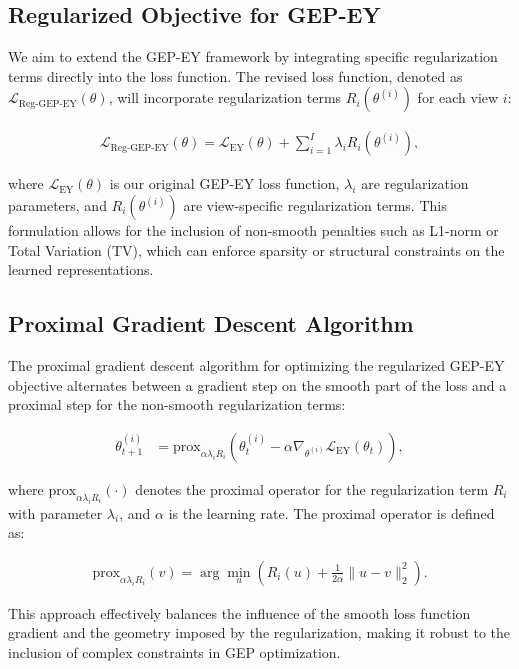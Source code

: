 \subsection{Regularized Objective for GEP-EY}

We aim to extend the GEP-EY framework by integrating specific regularization terms directly into the loss function. The revised loss function, denoted as $\mathcal{L}_{\text{Reg-GEP-EY}}(\theta)$, will incorporate regularization terms $R_i(\theta^{(i)})$ for each view $i$:

\begin{align}
    \mathcal{L}_{\text{Reg-GEP-EY}}(\theta) = \mathcal{L}_{\text{EY}}(\theta) + \sum_{i=1}^I \lambda_i R_i(\theta^{(i)}),
\end{align}

where $\mathcal{L}_{\text{EY}}(\theta)$ is our original GEP-EY loss function, $\lambda_i$ are regularization parameters, and $R_i(\theta^{(i)})$ are view-specific regularization terms. This formulation allows for the inclusion of non-smooth penalties such as L1-norm or Total Variation (TV), which can enforce sparsity or structural constraints on the learned representations.

\subsection{Proximal Gradient Descent Algorithm}

The proximal gradient descent algorithm for optimizing the regularized GEP-EY objective alternates between a gradient step on the smooth part of the loss and a proximal step for the non-smooth regularization terms:

\begin{align}
\theta^{(i)}_{t+1} &= \text{prox}_{\alpha \lambda_i R_i}\left(\theta^{(i)}_t - \alpha \nabla_{\theta^{(i)}} \mathcal{L}_{\text{EY}}(\theta_t)\right),
\end{align}

where $\text{prox}_{\alpha \lambda_i R_i}(\cdot)$ denotes the proximal operator for the regularization term $R_i$ with parameter $\lambda_i$, and $\alpha$ is the learning rate. The proximal operator is defined as:

\begin{align}
\text{prox}_{\alpha \lambda_i R_i}(v) = \arg \min_u \left( R_i(u) + \frac{1}{2\alpha} \|u - v\|_2^2 \right).
\end{align}

This approach effectively balances the influence of the smooth loss function gradient and the geometry imposed by the regularization, making it robust to the inclusion of complex constraints in GEP optimization.

